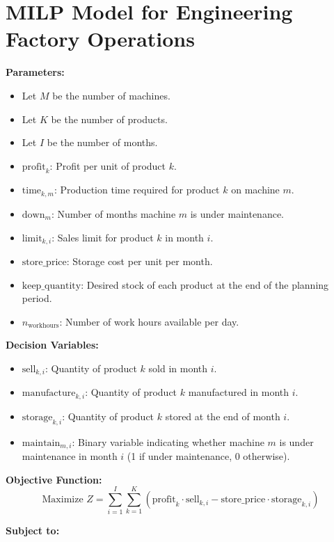\documentclass{article}
\begin{document}
\section*{MILP Model for Engineering Factory Operations}

\textbf{Parameters:}
\begin{itemize}
    \item Let \( M \) be the number of machines.
    \item Let \( K \) be the number of products.
    \item Let \( I \) be the number of months.
    \item \( \text{profit}_k \): Profit per unit of product \( k \).
    \item \( \text{time}_{k,m} \): Production time required for product \( k \) on machine \( m \).
    \item \( \text{down}_m \): Number of months machine \( m \) is under maintenance.
    \item \( \text{limit}_{k,i} \): Sales limit for product \( k \) in month \( i \).
    \item \( \text{store\_price} \): Storage cost per unit per month.
    \item \( \text{keep\_quantity} \): Desired stock of each product at the end of the planning period.
    \item \( n_{\text{workhours}} \): Number of work hours available per day.
\end{itemize}

\textbf{Decision Variables:}
\begin{itemize}
    \item \( \text{sell}_{k,i} \): Quantity of product \( k \) sold in month \( i \).
    \item \( \text{manufacture}_{k,i} \): Quantity of product \( k \) manufactured in month \( i \).
    \item \( \text{storage}_{k,i} \): Quantity of product \( k \) stored at the end of month \( i \).
    \item \( \text{maintain}_{m,i} \): Binary variable indicating whether machine \( m \) is under maintenance in month \( i \) (1 if under maintenance, 0 otherwise).
\end{itemize}

\textbf{Objective Function:}
\[
\text{Maximize } Z = \sum_{i=1}^{I} \sum_{k=1}^{K} \left( \text{profit}_k \cdot \text{sell}_{k,i} - \text{store\_price} \cdot \text{storage}_{k,i} \right)
\]

\textbf{Subject to:}
\end{document}
